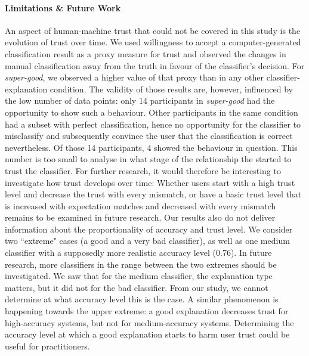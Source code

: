 \paragraph{Limitations \& Future Work}
An aspect of human-machine trust that could not be covered in this study is the evolution of trust over time. We used willingness to accept a computer-generated classification result as a proxy measure for trust and observed the changes in manual classification away from the truth in favour of the classifier's decision. For \textit{super-good}, we observed a higher value of that proxy than in any other classifier-explanation condition. The validity of those results are, however, influenced by the low number of data points: only 14 participants in \textit{super-good} had the opportunity to show such a behaviour. Other participants in the same condition had a subset with perfect classification, hence no opportunity for the classifier to misclassify and subsequently convince the user that the classification is correct nevertheless. Of those 14 participants, 4 showed the behaviour in question. This number is too small to analyse in what stage of the relationship the started to trust the classifier. For further research, it would therefore be interesting to investigate how trust develops over time: Whether users start with a high trust level and decrease the trust with every mismatch, or have a basic trust level that is increased with expectation matches and decreased with every mismatch remains to be examined in future research.\newline
Our results also do not deliver information about the proportionality of accuracy and trust level. We consider two ``extreme" cases (a good and a very bad classifier), as well as one medium classifier with a supposedly more realistic accuracy level (0.76). In future research, more classifiers in the range between the two extremes should be investigated. We saw that for the medium classifier, the explanation type matters, but it did not for the bad classifier. From our study, we cannot determine at what accuracy level this is the case. A similar phenomenon is happening towards the upper extreme: a good explanation decreases trust for high-accuracy systems, but not for medium-accuracy systems. Determining the accuracy level at which a good explanation starts to harm user trust could be useful for practitioners.\newline
